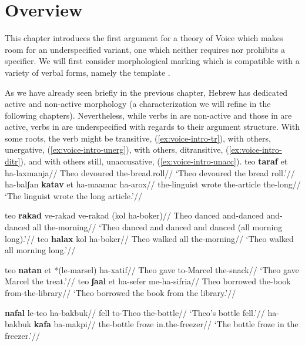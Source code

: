 \label{chap:voice}
\section{Overview} \label{voice:intro}
This chapter introduces the first argument for a theory of Voice which makes room for an underspecified variant, one which neither requires nor prohibits a specifier. We will first consider morphological marking which is compatible with a variety of verbal forms, namely the template {\tkal}.

As we have already seen briefly in the previous chapter, Hebrew has dedicated active and non-active morphology (a characterization we will refine in the following chapters). Nevertheless, while verbs in {\tnif} are non-active and those in {\thif} are active, verbs in {\tkal} are underspecified with regards to their argument structure. With some roots, the verb might be transitive, (\ref{ex:voice-intro-tr}), with others, unergative, (\ref{ex:voice-intro-unerg}), with others, ditransitive, (\ref{ex:voice-intro-ditr}), and with others still, unaccusative, (\ref{ex:voice-intro-unacc}).
\pex\label{ex:voice-intro-tr}
	\a \begingl
		\gla teo \textbf{taraf} et ha-laxmanja//
		\glb Theo devoured  the-bread.roll//
		\glft `Theo devoured the bread roll.'//
	\endgl
	\a \begingl
		\gla ha-balʃan \textbf{katav} et ha-maamar ha-arox//
		\glb the-linguist wrote  the-article the-long//
		\glft `The linguist wrote the long article.'//
	\endgl
\xe

\pex\label{ex:voice-intro-unerg}
	\a \begingl
		\gla teo \textbf{rakad} ve-rakad ve-rakad (kol ha-boker)//
		\glb Theo danced and-danced and-danced all the-morning//
		\glft `Theo danced and danced and danced (all morning long).'//
	\endgl
	\a \begingl
		\gla teo \textbf{halax} kol ha-boker//
		\glb Theo walked all the-morning//
		\glft `Theo walked all morning long.'//
	\endgl
\xe

\pex\label{ex:voice-intro-ditr}
	\a \begingl
		\gla teo \textbf{natan} et *(le-marsel) ha-xatif//
		\glb Theo gave  to-Marcel the-snack//
		\glft `Theo gave Marcel the treat.'//
	\endgl
	\a \begingl
		\gla teo \textbf{ʃaal} et ha-sefer me-ha-sifria//
		\glb Theo borrowed  the-book from-the-library//
		\glft `Theo borrowed the book from the library.'//
	\endgl
\xe

\pex\label{ex:voice-intro-unacc}
	\a \begingl
		\gla \textbf{nafal} le-teo ha-bakbuk//
		\glb fell to-Theo the-bottle//
		\glft `Theo's bottle fell.'//
	\endgl
	\a \begingl
		\gla ha-bakbuk \textbf{kafa} ba-makpi//
		\glb the-bottle froze in.the-freezer//
		\glft `The bottle froze in the freezer.'//
	\endgl
\xe

